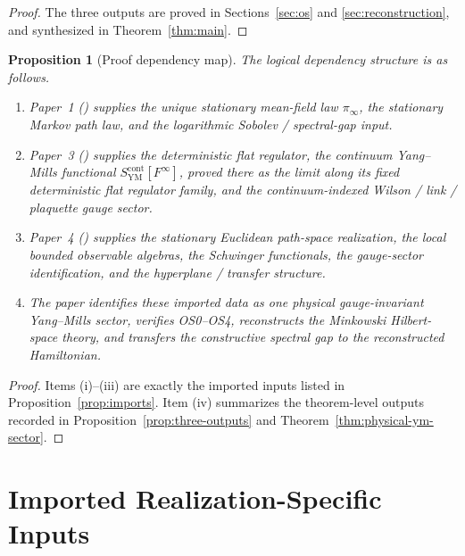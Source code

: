 \documentclass[11pt]{article}
\newtheorem{proposition}[theorem]{Proposition}
\theoremstyle{definition}
\theoremstyle{remark}
\begin{document}
\begin{proof}
The three outputs are proved in Sections~\ref{sec:os} and
\ref{sec:reconstruction}, and synthesized in Theorem~\ref{thm:main}.
\end{proof}

\begin{proposition}[Proof dependency map]
\label{prop:dependency-map}
The logical dependency structure is as follows.
\begin{enumerate}[label=\textnormal{(\roman*)},leftmargin=1.5em]
\item Paper~1 (\cite{convergence}) supplies the unique stationary mean-field
law \(\pi_\infty\), the stationary Markov path law, and the logarithmic Sobolev
/ spectral-gap input.
\item Paper~3 (\cite{lattice}) supplies the deterministic flat regulator, the
continuum Yang--Mills functional \(S_{\mathrm{YM}}^{\mathrm{cont}}[F^\infty]\),
proved there as the limit along its fixed deterministic flat regulator family,
and the continuum-indexed Wilson / link / plaquette gauge sector.
\item Paper~4 (\cite{quantization}) supplies the stationary Euclidean path-space
realization, the local bounded observable algebras, the Schwinger functionals,
the gauge-sector identification, and the hyperplane / transfer structure.
\item The paper identifies these imported data as one physical
gauge-invariant Yang--Mills sector, verifies OS0--OS4, reconstructs the
Minkowski Hilbert-space theory, and transfers the constructive spectral gap to
the reconstructed Hamiltonian.
\end{enumerate}
\end{proposition}

\begin{proof}
Items \textnormal{(i)}--\textnormal{(iii)} are exactly the imported inputs
listed in Proposition~\ref{prop:imports}.  Item \textnormal{(iv)} summarizes
the theorem-level outputs recorded in Proposition~\ref{prop:three-outputs} and
Theorem~\ref{thm:physical-ym-sector}.
\end{proof}

\section{Imported Realization-Specific Inputs}
\label{sec:imports}
\end{document}
